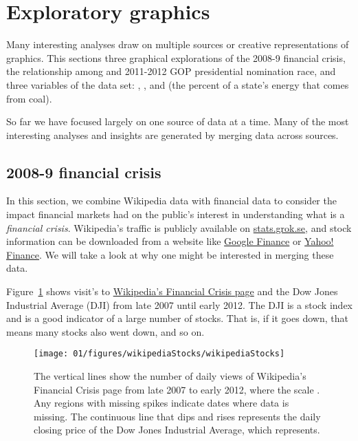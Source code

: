 

\section{Exploratory graphics}
\label{exploratoryGraphicsSection}

Many interesting analyses draw on multiple sources or creative representations of graphics. This sections three graphical explorations of the 2008-9 financial crisis, the relationship among and 2011-2012 GOP presidential nomination race, and three variables of the  data set: , , and  (the percent of a state's energy that comes from coal).

So far we have focused largely on one source of data at a time. Many of the most interesting analyses and insights are generated by merging data across sources.

\subsection{2008-9 financial crisis}

In this section, we combine Wikipedia data with financial data to consider the impact financial markets had on the public's interest in understanding what is a \emph{financial crisis}. Wikipedia's traffic is publicly available on \href{http://stats.grok.se/}{stats.grok.se}, and stock information can be downloaded from a website like \href{http://www.google.com/finance}{Google Finance} or \href{http://finance.yahoo.com/}{Yahoo! Finance}. We will take a look at why one might be interested in merging these data.

Figure~\ref{wikipediaStocks} shows visit's to  \href{http://en.wikipedia.org/wiki/Financial_crisis}{Wikipedia's Financial Crisis page} and the Dow Jones Industrial Average (DJI) from late 2007 until early 2012. The DJI is a stock index and is a good indicator of a large number of stocks. That is, if it goes down, that means many stocks also went down, and so on.
\begin{figure}
   \centering
   \texttt{[image: 01/figures/wikipediaStocks/wikipediaStocks]}
   \caption{The vertical lines show the number of daily views of Wikipedia's Financial Crisis page from late 2007 to early 2012, where the scale . Any regions with missing spikes indicate dates where data is missing. The continuous line that dips and rises represents the daily closing price of the Dow Jones Industrial Average, which represents.}
   \label{wikipediaStocks}
\end{figure}

